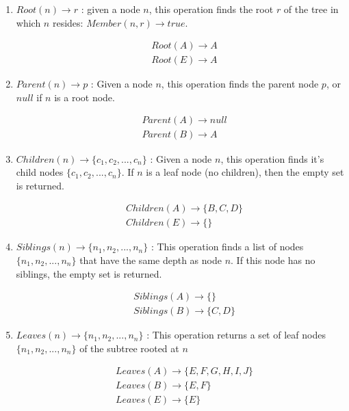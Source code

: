 \begin{enumerate}

\item $Root(n) \rightarrow r$ : given a node $n$, this operation finds the root $r$ of the tree in which $n$ resides: $Member(n, r) \rightarrow true$.

    \begin{align*}
    & Root(A) \rightarrow A \\
    & Root(E) \rightarrow A
    \end{align*}

    
\item $Parent(n) \rightarrow p$ : Given a node $n$, this operation finds the parent node $p$, or $null$ if $n$ is a root node.

    \begin{align*}
    & Parent(A) \rightarrow  null \\
    & Parent(B) \rightarrow A
    \end{align*}

\item $Children(n) \rightarrow \{c_1, c_2, ..., c_n\}$ : Given a node $n$, this operation finds it's child nodes $\{c_1, c_2, ..., c_n\}$. If $n$ is a leaf node (no children), then the empty set is returned.

    \begin{align*}
    & Children(A) \rightarrow \{B, C, D\} \\
    & Children(E) \rightarrow \{\}
    \end{align*}
    
\item $Siblings(n) \rightarrow \{n_1, n_2, ..., n_n\}$ : This operation finds a list of nodes $\{n_1, n_2, ..., n_n\}$ that have the same depth as node $n$. If this node has no siblings, the empty set is returned.

    \begin{align*}
    & Siblings(A) \rightarrow \{\} \\
    & Siblings(B) \rightarrow \{C, D\}
    \end{align*}

\item $Leaves(n) \rightarrow \{n_1, n_2, ..., n_n\}$ : This operation returns a set of leaf nodes $\{n_1, n_2, ..., n_n\}$ of the subtree rooted at $n$

    \begin{align*}
    & Leaves(A) \rightarrow \{E, F, G, H, I, J\} \\
    & Leaves(B) \rightarrow \{E, F\} \\
    & Leaves(E) \rightarrow \{E\}
    \end{align*}
    

\end{enumerate}
